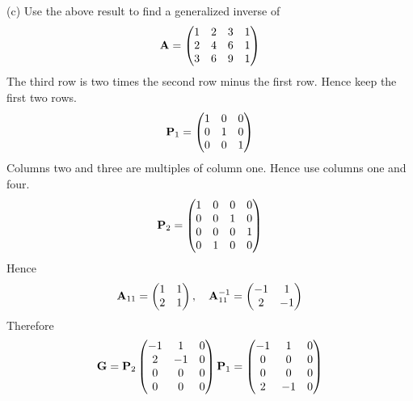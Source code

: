 \bigskip
\noindent
(c) Use the above result to find a generalized inverse of
$${\bf A}=\left(\begin{matrix}
1 & 2 & 3 & 1\cr
2 & 4 & 6 & 1\cr
3 & 6 & 9 & 1
\end{matrix}\right)
$$
The third row is two times the second row minus the first row.
Hence keep the first two rows.
$${\bf P}_1=\left(\begin{matrix}
1 & 0 & 0\cr
0 & 1 & 0\cr
0 & 0 & 1
\end{matrix}\right)
$$
Columns two and three are multiples of column one.
Hence use columns one and four.
$${\bf P}_2=\left(\begin{matrix}
1 & 0 & 0 & 0\cr
0 & 0 & 1 & 0\cr
0 & 0 & 0 & 1\cr
0 & 1 & 0 & 0
\end{matrix}\right)
$$
Hence
$${\bf A}_{11}=\left(\begin{matrix}
1 & 1\cr
2 & 1
\end{matrix}\right),\quad{\bf A}_{11}^{-1}=
\left(\begin{matrix}
-1 & 1\cr
2 & -1
\end{matrix}\right)
$$
Therefore
$${\bf G}=
{\bf P}_2\left(\begin{matrix}
-1 & 1 & 0 \cr
2 & -1 & 0\cr
0 & 0 & 0\cr
0 & 0 & 0
\end{matrix}\right){\bf P}_1
=\left(\begin{matrix}
-1 & 1 & 0\cr
0 & 0 & 0\cr
0 & 0 & 0\cr
2 & -1 & 0
\end{matrix}\right)
$$
